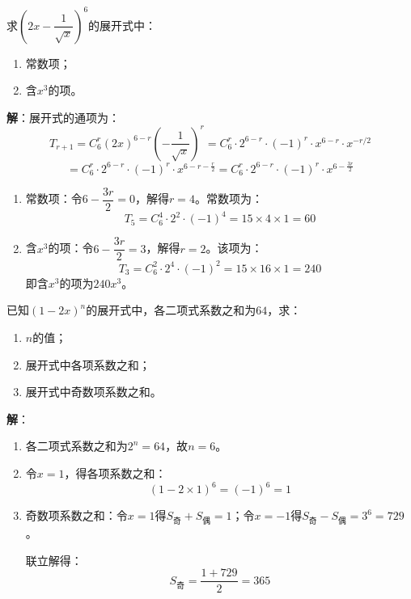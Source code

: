 \documentclass[12pt, a4paper]{ctexart}
\begin{document}
\begin{examplebox}
求$\left(2x - \dfrac{1}{\sqrt{x}}\right)^6$的展开式中：
\begin{enumerate}[label=(\arabic*)]
  \item 常数项；
  \item 含$x^3$的项。
\end{enumerate}

\textbf{解}：展开式的通项为：
\[
T_{r+1} = C_6^r (2x)^{6-r} \left(-\frac{1}{\sqrt{x}}\right)^r = C_6^r \cdot 2^{6-r} \cdot (-1)^r \cdot x^{6-r} \cdot x^{-r/2}
\]
\[
= C_6^r \cdot 2^{6-r} \cdot (-1)^r \cdot x^{6 - r - \frac{r}{2}} = C_6^r \cdot 2^{6-r} \cdot (-1)^r \cdot x^{6 - \frac{3r}{2}}
\]

\begin{enumerate}[label=(\arabic*)]
  \item 常数项：令$6 - \dfrac{3r}{2} = 0$，解得$r = 4$。常数项为：
  \[
  T_5 = C_6^4 \cdot 2^2 \cdot (-1)^4 = 15 \times 4 \times 1 = 60
  \]

  \item 含$x^3$的项：令$6 - \dfrac{3r}{2} = 3$，解得$r = 2$。该项为：
  \[
  T_3 = C_6^2 \cdot 2^4 \cdot (-1)^2 = 15 \times 16 \times 1 = 240
  \]
  即含$x^3$的项为$240x^3$。
\end{enumerate}
\end{examplebox}

\begin{examplebox}[【例题8】二项式系数之和与项的系数之和]
已知$(1 - 2x)^n$的展开式中，各二项式系数之和为$64$，求：
\begin{enumerate}[label=(\arabic*)]
  \item $n$的值；
  \item 展开式中各项系数之和；
  \item 展开式中奇数项系数之和。
\end{enumerate}

\textbf{解}：
\begin{enumerate}[label=(\arabic*)]
  \item 各二项式系数之和为$2^n = 64$，故$n = 6$。

  \item 令$x = 1$，得各项系数之和：
  \[
  (1 - 2 \times 1)^6 = (-1)^6 = 1
  \]

  \item 奇数项系数之和：令$x = 1$得$S_{\text{奇}} + S_{\text{偶}} = 1$；令$x = -1$得$S_{\text{奇}} - S_{\text{偶}} = 3^6 = 729$。

  联立解得：
  \[
  S_{\text{奇}} = \frac{1 + 729}{2} = 365
  \]
\end{enumerate}
\end{examplebox}
\end{document}
